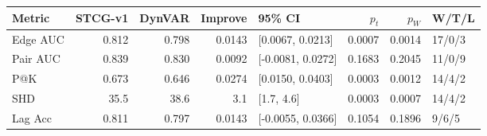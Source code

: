 \begin{tabular}{lrrrlrrl}
\toprule
Metric & STCG-v1 & DynVAR & Improve & 95\% CI & $p_t$ & $p_W$ & W/T/L \\
\midrule
Edge AUC & 0.812 & 0.798 & 0.0143 & [0.0067, 0.0213] & 0.0007 & 0.0014 & 17/0/3 \\
Pair AUC & 0.839 & 0.830 & 0.0092 & [-0.0081, 0.0272] & 0.1683 & 0.2045 & 11/0/9 \\
P@K & 0.673 & 0.646 & 0.0274 & [0.0150, 0.0403] & 0.0003 & 0.0012 & 14/4/2 \\
SHD & 35.5 & 38.6 & 3.1 & [1.7, 4.6] & 0.0003 & 0.0007 & 14/4/2 \\
Lag Acc & 0.811 & 0.797 & 0.0143 & [-0.0055, 0.0366] & 0.1054 & 0.1896 & 9/6/5 \\
\bottomrule
\end{tabular}
